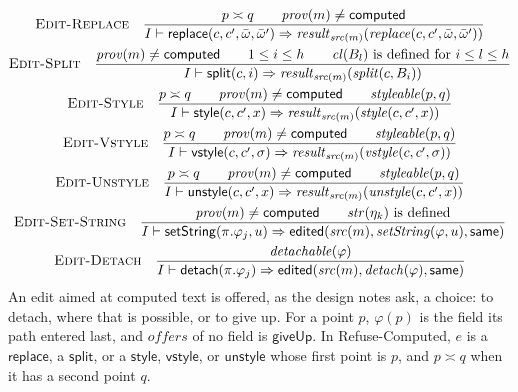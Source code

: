 \documentclass[11pt]{article}
\numberwithin{equation}{section}
\newcommand{\kw}[1]{\ensuremath{\mathsf{#1}}}
\newcommand{\rulelabel}[1]{\textsc{#1}}
\begin{document}
\begin{gather}
\rulelabel{Edit-Replace}\quad
\frac{p \asymp q \qquad \mathit{prov}(m) \neq \kw{computed}}
     {I \vdash \kw{replace}(c, c', \bar\omega, \bar\omega') \Rightarrow
      \mathit{result}_{\mathit{src}(m)}(\mathit{replace}(c, c', \bar\omega,
        \bar\omega'))}
\\
\rulelabel{Edit-Split}\quad
\frac{\mathit{prov}(m) \neq \kw{computed} \qquad 1 \le i \le h \qquad
      \mathit{cl}(B_l) \text{ is defined for } i \le l \le h}
     {I \vdash \kw{split}(c, i) \Rightarrow
      \mathit{result}_{\mathit{src}(m)}(\mathit{split}(c, B_i))}
\\
\rulelabel{Edit-Style}\quad
\frac{p \asymp q \qquad \mathit{prov}(m) \neq \kw{computed} \qquad
      \mathit{styleable}(p, q)}
     {I \vdash \kw{style}(c, c', x) \Rightarrow
      \mathit{result}_{\mathit{src}(m)}(\mathit{style}(c, c', x))}
\\
\rulelabel{Edit-Vstyle}\quad
\frac{p \asymp q \qquad \mathit{prov}(m) \neq \kw{computed} \qquad
      \mathit{styleable}(p, q)}
     {I \vdash \kw{vstyle}(c, c', \sigma) \Rightarrow
      \mathit{result}_{\mathit{src}(m)}(\mathit{vstyle}(c, c', \sigma))}
\\
\rulelabel{Edit-Unstyle}\quad
\frac{p \asymp q \qquad \mathit{prov}(m) \neq \kw{computed} \qquad
      \mathit{styleable}(p, q)}
     {I \vdash \kw{unstyle}(c, c', x) \Rightarrow
      \mathit{result}_{\mathit{src}(m)}(\mathit{unstyle}(c, c', x))}
\\
\rulelabel{Edit-Set-String}\quad
\frac{\mathit{prov}(m) \neq \kw{computed} \qquad
      \mathit{str}(\eta_k) \text{ is defined}}
     {I \vdash \kw{setString}(\pi.\varphi_j, u) \Rightarrow
      \kw{edited}(\mathit{src}(m), \mathit{setString}(\varphi, u),
        \kw{same})}
\\
\rulelabel{Edit-Detach}\quad
\frac{\mathit{detachable}(\varphi)}
     {I \vdash \kw{detach}(\pi.\varphi_j) \Rightarrow
      \kw{edited}(\mathit{src}(m), \mathit{detach}(\varphi), \kw{same})}
\end{gather}
An edit aimed at computed text is offered, as the design notes ask, a
choice: to detach, where that is possible, or to give up.  For a point $p$,
$\varphi(p)$ is the field its path entered last, and $\mathit{offers}$ of
no field is $\kw{giveUp}$.  In Refuse-Computed, $e$ is a $\kw{replace}$, a
$\kw{split}$, or a $\kw{style}$, $\kw{vstyle}$, or $\kw{unstyle}$ whose first
point is $p$, and $p \asymp q$ when it has a second point $q$.
\end{document}
